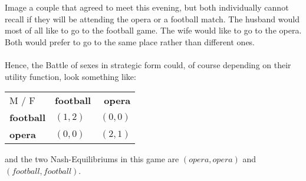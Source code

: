\begin{example} \label{battleofthesexes} 
		Image a couple that agreed to meet this evening, but both individually cannot recall if they will be attending the opera or a football match. The husband would most of all like to go to the football game. The wife would like to go to the opera. Both would prefer to go to the same place rather than different ones. \\ \\
		Hence, the Battle of sexes in strategic form could, of course depending on their utility function, look something like:
		\begin{center}
			\begin{tabular}{|l|l|r|}
				\hline\hline
  					M / F & \textbf{football} & \textbf{opera} \\
         				\cline{1-3}
   					\textbf{football} & $(1, 2)$ & $(0, 0)$ 	\arrayrulewidth2pt \\
            			\cline{1-3}
   					\textbf{opera} & $(0, 0)$ & $(2, 1)$ \\ \hline\hline
			\end{tabular}	
		\end{center}
		
		and the two Nash-Equilibriums in this game are $(opera, opera)$ and $(football, football)$.
\end{example}

